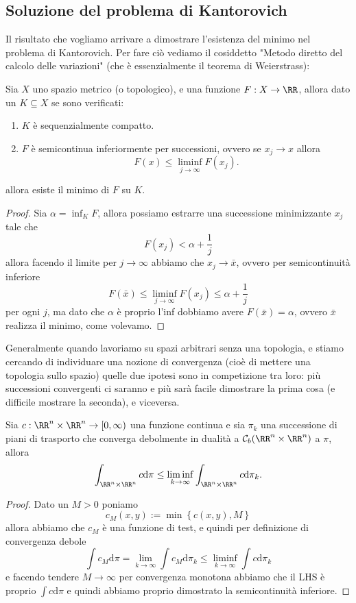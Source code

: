 \documentclass[11pt]{scrartcl}
\newcommand{\dif}{\text{d}}
\begin{document}
	\subsection{Soluzione del problema di Kantorovich}
	Il risultato che vogliamo arrivare a dimostrare l'esistenza del minimo nel problema di Kantorovich.
	Per fare ciò vediamo il cosiddetto "Metodo diretto del calcolo delle variazioni" (che è essenzialmente il teorema di Weierstrass):
	\begin{theorem}
		Sia $X$ uno spazio metrico (o topologico), e una funzione $F:X\to\RR$, allora dato un $K\subseteq X$ se sono verificati:
		\begin{enumerate}
			\item $K$ è sequenzialmente compatto.
			\item $F$ è semicontinua inferiormente per successioni, ovvero se $x_j\to x$ allora
			$$F(x)\le \liminf_{j\to\infty}F(x_j).$$
		\end{enumerate}
		allora esiste il minimo di $F$ su $K$.
	\end{theorem}
	\begin{proof}
		Sia $\alpha=\inf_K F$, allora possiamo estrarre una successione minimizzante $x_j$ tale che
		$$F(x_j)<\alpha+\frac{1}{j}$$
		allora facendo il limite per $j\to\infty$ abbiamo che $x_j\to \bar{x}$, ovvero per semicontinuità inferiore
		$$F(\bar{x})\le \liminf_{j\to\infty} F(x_j)\le \alpha+\frac{1}{j}$$
		per ogni $j$, ma dato che $\alpha$ è proprio l'inf dobbiamo avere $F(\bar{x})=\alpha$, ovvero $\bar{x}$ realizza il minimo, come volevamo.
	\end{proof}
	Generalmente quando lavoriamo su spazi arbitrari senza una topologia, e stiamo cercando di individuare una nozione di convergenza (cioè di mettere una topologia sullo spazio) quelle due ipotesi sono in competizione tra loro: più successioni convergenti ci saranno e più sarà facile dimostrare la prima cosa (e difficile mostrare la seconda), e viceversa.
	\begin{theorem}
		Sia $c:\RR^n\times\RR^n\to [0,\infty)$ una funzione continua e sia $\pi_k$ una successione di piani di trasporto che converga debolmente in dualità a $\mathcal{C}_b(\RR^n\times\RR^n)$ a $\pi$, allora
		$$\int_{\RR^n\times\RR^n} c \dif \pi\le \liminf_{k\to\infty}\int_{\RR^n\times\RR^n}c\dif \pi_k.$$
	\end{theorem}
	\begin{proof}
		Dato un $M>0$ poniamo 
		$$c_M(x,y):=\min\left\{c(x,y),M\right\}$$
		allora abbiamo che $c_M$ è una funzione di test, e quindi per definizione di convergenza debole
		$$\int c_M\dif \pi = \lim_{k\to\infty}\int c_M\dif \pi_k\le \liminf_{k\to\infty}\int c\dif \pi_k $$
		e facendo tendere $M\to\infty$ per convergenza monotona abbiamo che il LHS è proprio $\int c\dif \pi$ e quindi abbiamo proprio dimostrato la semicontinuità inferiore.
	\end{proof} 
\end{document}
